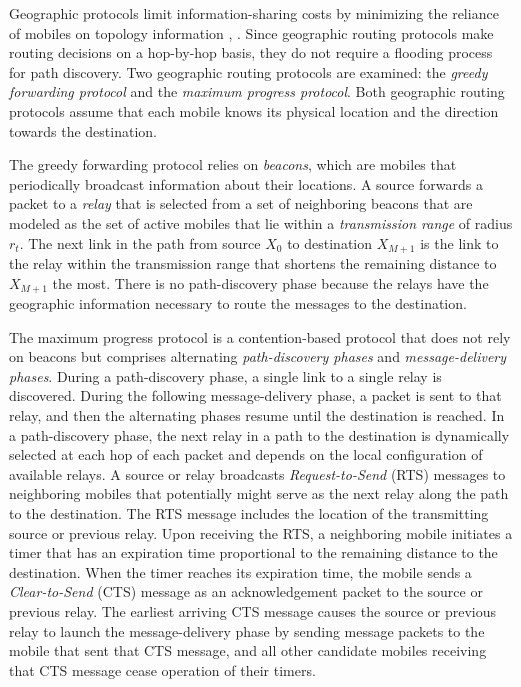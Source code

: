 \documentclass[conference]{IEEEtran}
\begin{document}
Geographic protocols limit information-sharing costs
by minimizing the reliance of mobiles on topology
information \cite{cad},
\cite{ghaf}. Since geographic routing protocols
make routing decisions on a hop-by-hop basis, they do
not require a flooding process for path discovery. Two
geographic routing protocols are examined: the
\emph{greedy
forwarding protocol}
and the
\emph{maximum progress protocol}.
Both geographic routing protocols assume that each
mobile knows its physical location and the direction
towards the destination.

The greedy forwarding protocol relies on
\emph{beacons}, which are mobiles that periodically broadcast information about their locations. A source forwards a packet to a
\emph{relay}
that is selected from a set of neighboring
beacons that are modeled as the set of active mobiles that
lie within a
\emph{transmission range}
of radius
$r_t$. The next
link in the path from source
$X_{0}$ to destination
$X_{M+1}$ is the link to the relay within the transmission range
that shortens the remaining distance to
$X_{M+1}$ the most.
There is no path-discovery phase because the relays
have the geographic information necessary to route the
messages to the destination.

The maximum progress protocol is a contention-based
protocol that does not rely on beacons but comprises
alternating
\emph{path-discovery phases}
and
\emph{message-delivery
phases}. During a path-discovery phase, a single link to a
single relay is discovered. During the following message-delivery phase, a packet is sent to that relay, and then
the alternating phases resume until the destination is
reached. In a path-discovery phase, the next relay in a
path to the destination is dynamically selected at each
hop of each packet and depends on the local configuration of available relays. A source or relay broadcasts
\emph{Request-to-Send}
(RTS) messages to neighboring mobiles
that potentially might serve as the next relay along the
path to the destination. The RTS message includes the
location of the transmitting source or previous relay.
Upon receiving the RTS, a neighboring mobile initiates
a timer that has an expiration time proportional to the
remaining distance to the destination. When the timer
reaches its expiration time, the mobile sends a
\emph{Clear-to-Send}
(CTS) message as an acknowledgement packet to
the source or previous relay. The earliest arriving CTS
message causes the source or previous relay to launch
the message-delivery phase by sending message packets
to the mobile that sent that CTS message, and all other
candidate mobiles receiving that CTS message cease
operation of their timers.
\end{document}
